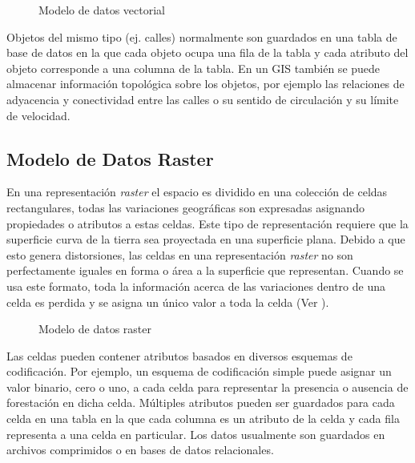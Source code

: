 \begin{figure}[h]
	\centering
	
	\caption{Modelo de datos vectorial}
	\label{fig:modelo-vectorial} 
\end{figure}

Objetos del mismo tipo (ej. calles) normalmente son guardados en una tabla de base de datos en la que cada objeto ocupa una fila de la tabla y cada atributo del objeto corresponde a una columna de la tabla. En un GIS también se puede almacenar información topológica sobre los objetos, por ejemplo las relaciones de adyacencia y conectividad entre las calles o su sentido de circulación y su límite de velocidad.

\subsection{Modelo de Datos Raster}


En una representación \emph{raster} el espacio es dividido en una colección de celdas rectangulares, todas las variaciones geográficas son expresadas asignando propiedades o atributos a estas celdas. Este tipo de representación requiere que la superficie curva de la tierra sea proyectada en una superficie plana. Debido a que esto genera distorsiones, las celdas en una representación \emph{raster} no son perfectamente iguales en forma o área a la superficie que representan. Cuando se usa este formato, toda la información acerca de las variaciones dentro de una celda es perdida y se asigna un único valor a toda la celda (Ver ).

\begin{figure}[h]
	\centering
	
	\caption{Modelo de datos raster}
	\label{fig:modelo-raster} 
\end{figure}

Las celdas pueden contener atributos basados en diversos esquemas de codificación. Por ejemplo, un esquema de codificación simple puede asignar un valor binario, cero o uno, a cada celda para representar la presencia o ausencia de forestación en dicha celda. Múltiples atributos pueden ser guardados para cada celda en una tabla en la que cada columna es un atributo de la celda y cada fila representa a una celda en particular. Los datos usualmente son guardados en archivos comprimidos o en bases de datos relacionales.

